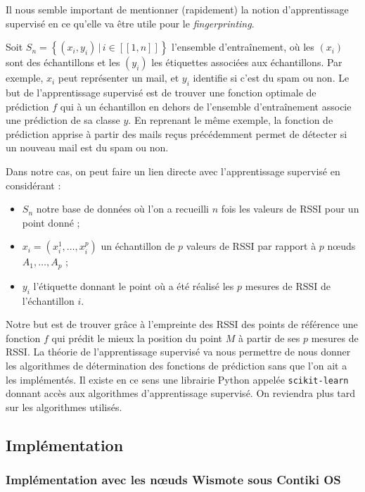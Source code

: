 \documentclass[french, a4paper, 12pt, parskip]{scrartcl}
\begin{document}
Il nous semble important de mentionner (rapidement) la notion d'apprentissage
supervisé en ce qu'elle va être utile pour le \textit{fingerprinting}.

Soit $S_n = \left\lbrace (x_i, y_i)\,|\,i\in[\![1, n]\!]\right\rbrace$
l'ensemble d'entraînement, où les $(x_i)$ sont des échantillons et les $(y_i)$
les étiquettes associées aux échantillons. Par exemple, $x_i$ peut représenter
un mail, et $y_i$ identifie si c'est du spam ou non. Le but de l'apprentissage
supervisé est de trouver une fonction optimale de prédiction $f$ qui à un
échantillon en dehors de l'ensemble d'entraînement associe une prédiction de sa
classe $y$. En reprenant le même exemple, la fonction de prédiction apprise à
partir des mails reçus précédemment permet de détecter si un nouveau mail est du
spam ou non.

Dans notre cas, on peut faire un lien directe avec l'apprentissage supervisé en
considérant :
\begin{itemize}
  \item $S_n$ notre base de données où l'on a recueilli $n$ fois les valeurs de
    RSSI pour un point donné ;
  \item $x_i = \left(x_i^1, \dotsc, x_i^p\right)$ un échantillon de $p$ valeurs
    de RSSI par rapport à $p$ nœuds $A_1, \dotsc, A_p$ ;
  \item $y_i$ l'étiquette donnant le point où a été réalisé les $p$ mesures de
    RSSI de l'échantillon $i$.
\end{itemize}

Notre but est de trouver grâce à l'empreinte des RSSI des points de référence
une fonction $f$ qui prédit le mieux la position du point $M$ à partir de ses
$p$ mesures de RSSI. La théorie de l'apprentissage supervisé va nous permettre
de nous donner les algorithmes de détermination des fonctions de prédiction
sans que l'on ait a les implémentés. Il existe en ce sens une librairie Python
appelée \verb+scikit-learn+ donnant accès aux algorithmes d'apprentissage
supervisé. On reviendra plus tard sur les algorithmes utilisés.

\subsection{Implémentation}

\subsubsection{Implémentation avec les nœuds Wismote sous Contiki OS}
\end{document}
